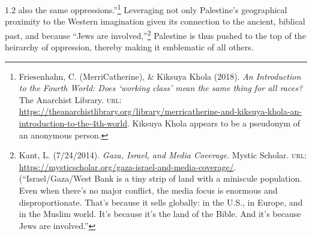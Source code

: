 \documentclass[../unravbook.tex]{subfiles}
\begin{document}
\begin{spacing}{1.2}
also the same oppressions.''\footnote{Friesenhahn, C. (MerriCatherine), \& Kiksuya Khola (2018). \textit{An Introduction to the Fourth World: Does `working class' mean the same thing for all races?} The Anarchist Library. \textsc{url: } \url{https://theanarchistlibrary.org/library/merricatherine-and-kiksuya-khola-an-introduction-to-the-4th-world}. Kiksuya Khola appears to be a pseudonym of an anonymous person.} Leveraging not only Palestine's geographical proximity to the Western imagination given its connection to the ancient, biblical past, and because ``Jews are involved,''\footnote{Kant, L.  (7/24/2014). \textit{Gaza, Israel, and Media Coverage}. Mystic Scholar. \textsc{url: } \url{https://mysticscholar.org/gaza-israel-and-media-coverage/}. (``Israel/Gaza/West Bank is a tiny strip of land with a miniscule population. Even when there's no major conflict, the media focus is enormous and disproportionate. That's because it sells globally: in the U.S., in Europe, and in the Muslim world. It's because it's the land of the Bible. And it's because Jews are involved.''} Palestine is thus pushed to the top of the heirarchy of oppression, thereby making it emblematic of all others. 


\end{spacing}
\end{document}
